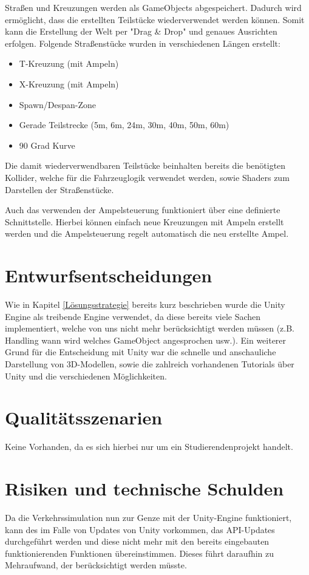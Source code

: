 Straßen und Kreuzungen werden als GameObjects abgespeichert. Dadurch wird ermöglicht, dass die erstellten Teilstücke wiederverwendet werden können. Somit kann die Erstellung der Welt per "Drag \& Drop" und genaues Ausrichten erfolgen. Folgende Straßenstücke wurden in verschiedenen Längen erstellt:

\begin{itemize}  
\item T-Kreuzung (mit Ampeln)
\item X-Kreuzung (mit Ampeln)
\item Spawn/Despan-Zone
\item Gerade Teilstrecke (5m, 6m, 24m, 30m, 40m, 50m, 60m)
\item 90 Grad Kurve
\end{itemize}

Die damit wiederverwendbaren Teilstücke beinhalten bereits die benötigten Kollider, welche für die Fahrzeuglogik verwendet werden, sowie Shaders zum Darstellen der Straßenstücke.

Auch das verwenden der Ampelsteuerung funktioniert über eine definierte Schnittstelle. Hierbei können einfach neue Kreuzungen mit Ampeln erstellt werden und die Ampelsteuerung regelt automatisch die neu erstellte Ampel.

\section{Entwurfsentscheidungen}
\label{Entwurfsentscheidungen}

Wie in Kapitel \ref{Lösungsstrategie} bereits kurz beschrieben wurde die Unity Engine als treibende Engine verwendet, da diese bereits viele Sachen implementiert, welche von uns nicht mehr berücksichtigt werden müssen (z.B. Handling wann wird welches GameObject angesprochen usw.). Ein weiterer Grund für die Entscheidung mit Unity war die schnelle und anschauliche Darstellung von 3D-Modellen, sowie die zahlreich vorhandenen Tutorials über Unity und die verschiedenen Möglichkeiten.

\section{Qualitätsszenarien}
\label{Qualitätsszenarien}

Keine Vorhanden, da es sich hierbei nur um ein Studierendenprojekt handelt.

\section{Risiken und technische Schulden}
\label{Risiken und technische Schulden}

Da die Verkehrssimulation nun zur Genze mit der Unity-Engine funktioniert, kann des im Falle von Updates von Unity vorkommen, das API-Updates durchgeführt werden und diese nicht mehr mit den bereits eingebauten funktionierenden Funktionen übereinstimmen. Dieses führt daraufhin zu Mehraufwand, der berücksichtigt werden müsste.